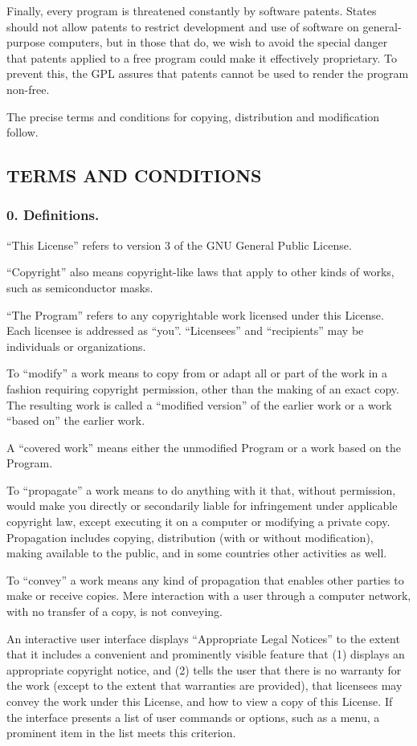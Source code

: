 Finally, every program is threatened constantly by software patents. States should not allow patents to restrict development and use of software on general-purpose computers, but in those that do, we wish to avoid the special danger that patents applied to a free program could make it effectively proprietary. To prevent this, the GPL assures that patents cannot be used to render the program non-free.\par
The precise terms and conditions for copying, distribution and modification follow.
\subsection{TERMS AND CONDITIONS}
\subsubsection{0. Definitions.}
“This License” refers to version 3 of the GNU General Public License.\par
“Copyright” also means copyright-like laws that apply to other kinds of works, such as semiconductor masks.\par
“The Program” refers to any copyrightable work licensed under this License. Each licensee is addressed as “you”. “Licensees” and “recipients” may be individuals or organizations.\par
To “modify” a work means to copy from or adapt all or part of the work in a fashion requiring copyright permission, other than the making of an exact copy. The resulting work is called a “modified version” of the earlier work or a work “based on” the earlier work.\par
A “covered work” means either the unmodified Program or a work based on the Program.\par
To “propagate” a work means to do anything with it that, without permission, would make you directly or secondarily liable for infringement under applicable copyright law, except executing it on a computer or modifying a private copy. Propagation includes copying, distribution (with or without modification), making available to the public, and in some countries other activities as well.\par
To “convey” a work means any kind of propagation that enables other parties to make or receive copies. Mere interaction with a user through a computer network, with no transfer of a copy, is not conveying.\par
An interactive user interface displays “Appropriate Legal Notices” to the extent that it includes a convenient and prominently visible feature that (1) displays an appropriate copyright notice, and (2) tells the user that there is no warranty for the work (except to the extent that warranties are provided), that licensees may convey the work under this License, and how to view a copy of this License. If the interface presents a list of user commands or options, such as a menu, a prominent item in the list meets this criterion.
